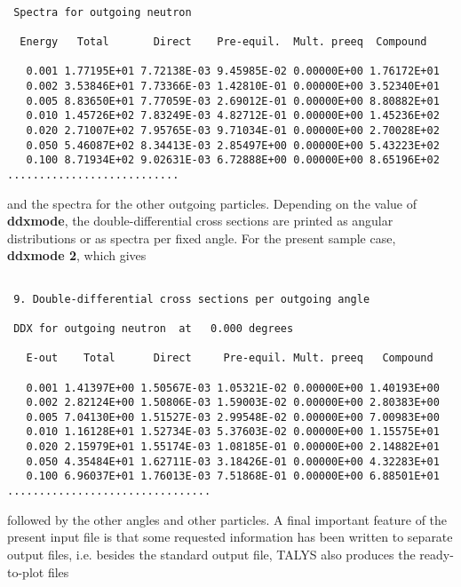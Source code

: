 \begin{samplecase}
{\small \begin{verbatim}

 Spectra for outgoing neutron 
  
  Energy   Total       Direct    Pre-equil.  Mult. preeq  Compound
  
   0.001 1.77195E+01 7.72138E-03 9.45985E-02 0.00000E+00 1.76172E+01
   0.002 3.53846E+01 7.73366E-03 1.42810E-01 0.00000E+00 3.52340E+01
   0.005 8.83650E+01 7.77059E-03 2.69012E-01 0.00000E+00 8.80882E+01
   0.010 1.45726E+02 7.83249E-03 4.82712E-01 0.00000E+00 1.45236E+02
   0.020 2.71007E+02 7.95765E-03 9.71034E-01 0.00000E+00 2.70028E+02
   0.050 5.46087E+02 8.34413E-03 2.85497E+00 0.00000E+00 5.43223E+02
   0.100 8.71934E+02 9.02631E-03 6.72888E+00 0.00000E+00 8.65196E+02
...........................
\end{verbatim} } \renewcommand{\baselinestretch}{1.07}\small\normalsize
\noindent
and the spectra for the other outgoing particles.
Depending on the value of {\bf ddxmode}, the double-differential cross 
sections are printed as angular distributions or as spectra per fixed angle.
For the present sample case, {\bf ddxmode 2}, which gives

{\small \begin{verbatim}

 9. Double-differential cross sections per outgoing angle
   
 DDX for outgoing neutron  at   0.000 degrees
   
   E-out    Total      Direct     Pre-equil. Mult. preeq   Compound
   
   0.001 1.41397E+00 1.50567E-03 1.05321E-02 0.00000E+00 1.40193E+00
   0.002 2.82124E+00 1.50806E-03 1.59003E-02 0.00000E+00 2.80383E+00
   0.005 7.04130E+00 1.51527E-03 2.99548E-02 0.00000E+00 7.00983E+00
   0.010 1.16128E+01 1.52734E-03 5.37603E-02 0.00000E+00 1.15575E+01
   0.020 2.15979E+01 1.55174E-03 1.08185E-01 0.00000E+00 2.14882E+01
   0.050 4.35484E+01 1.62711E-03 3.18426E-01 0.00000E+00 4.32283E+01
   0.100 6.96037E+01 1.76013E-03 7.51868E-01 0.00000E+00 6.88501E+01
................................
\end{verbatim} } \renewcommand{\baselinestretch}{1.07}\small\normalsize
\noindent
followed by the other angles and other particles.
A final important feature of the present input file is that some requested 
information has been written to separate output files, i.e. besides the 
standard output file, TALYS also produces the ready-to-plot files

{\small \begin{verbatim}


\end{verbatim}}
\end{samplecase}
